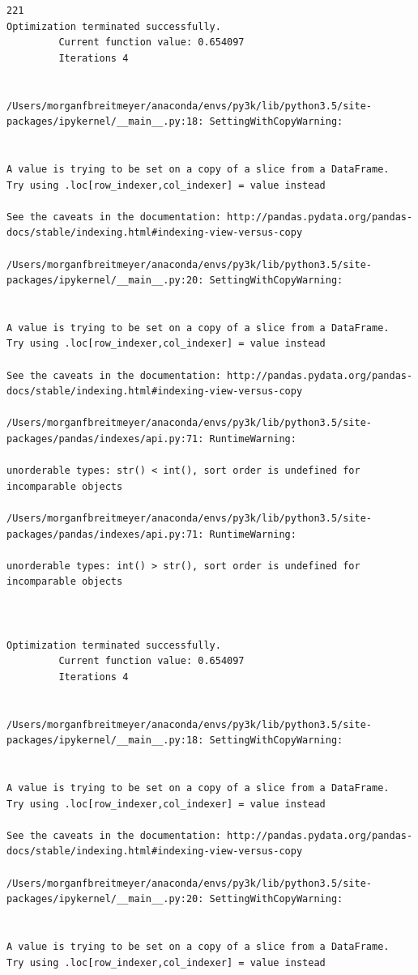 \begin{lstlisting}
221
Optimization terminated successfully.
         Current function value: 0.654097
         Iterations 4


/Users/morganfbreitmeyer/anaconda/envs/py3k/lib/python3.5/site-packages/ipykernel/__main__.py:18: SettingWithCopyWarning:


A value is trying to be set on a copy of a slice from a DataFrame.
Try using .loc[row_indexer,col_indexer] = value instead

See the caveats in the documentation: http://pandas.pydata.org/pandas-docs/stable/indexing.html#indexing-view-versus-copy

/Users/morganfbreitmeyer/anaconda/envs/py3k/lib/python3.5/site-packages/ipykernel/__main__.py:20: SettingWithCopyWarning:


A value is trying to be set on a copy of a slice from a DataFrame.
Try using .loc[row_indexer,col_indexer] = value instead

See the caveats in the documentation: http://pandas.pydata.org/pandas-docs/stable/indexing.html#indexing-view-versus-copy

/Users/morganfbreitmeyer/anaconda/envs/py3k/lib/python3.5/site-packages/pandas/indexes/api.py:71: RuntimeWarning:

unorderable types: str() < int(), sort order is undefined for incomparable objects

/Users/morganfbreitmeyer/anaconda/envs/py3k/lib/python3.5/site-packages/pandas/indexes/api.py:71: RuntimeWarning:

unorderable types: int() > str(), sort order is undefined for incomparable objects



Optimization terminated successfully.
         Current function value: 0.654097
         Iterations 4


/Users/morganfbreitmeyer/anaconda/envs/py3k/lib/python3.5/site-packages/ipykernel/__main__.py:18: SettingWithCopyWarning:


A value is trying to be set on a copy of a slice from a DataFrame.
Try using .loc[row_indexer,col_indexer] = value instead

See the caveats in the documentation: http://pandas.pydata.org/pandas-docs/stable/indexing.html#indexing-view-versus-copy

/Users/morganfbreitmeyer/anaconda/envs/py3k/lib/python3.5/site-packages/ipykernel/__main__.py:20: SettingWithCopyWarning:


A value is trying to be set on a copy of a slice from a DataFrame.
Try using .loc[row_indexer,col_indexer] = value instead


\end{lstlisting}
